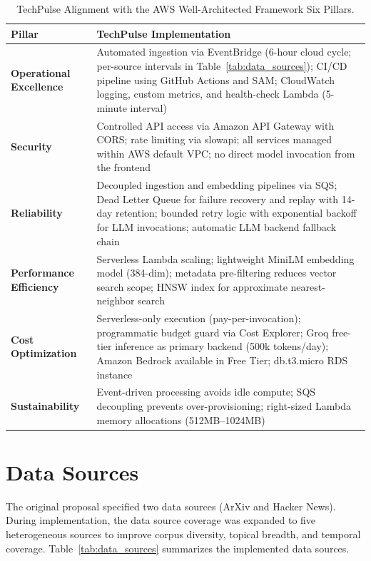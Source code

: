 \begin{table}[H]
\caption{TechPulse Alignment with the AWS Well-Architected Framework Six Pillars.}
\label{tab:well_arch}
\centering
\begin{tabular}{p{3.2cm}p{9.3cm}}
\toprule
\textbf{Pillar} & \textbf{TechPulse Implementation} \\
\midrule
\textbf{Operational Excellence} & Automated ingestion via EventBridge (6-hour cloud cycle; per-source intervals in Table~\ref{tab:data_sources}); CI/CD pipeline using GitHub Actions and SAM; CloudWatch logging, custom metrics, and health-check Lambda (5-minute interval) \\[4pt]
\textbf{Security} & Controlled API access via Amazon API Gateway with CORS; rate limiting via slowapi; all services managed within AWS default VPC; no direct model invocation from the frontend \\[4pt]
\textbf{Reliability} & Decoupled ingestion and embedding pipelines via SQS; Dead Letter Queue for failure recovery and replay with 14-day retention; bounded retry logic with exponential backoff for LLM invocations; automatic LLM backend fallback chain \\[4pt]
\textbf{Performance Efficiency} & Serverless Lambda scaling; lightweight MiniLM embedding model (384-dim); metadata pre-filtering reduces vector search scope; HNSW index for approximate nearest-neighbor search \\[4pt]
\textbf{Cost Optimization} & Serverless-only execution (pay-per-invocation); programmatic budget guard via Cost Explorer; Groq free-tier inference as primary backend (500k tokens/day); Amazon Bedrock available in Free Tier; db.t3.micro RDS instance \\[4pt]
\textbf{Sustainability} & Event-driven processing avoids idle compute; SQS decoupling prevents over-provisioning; right-sized Lambda memory allocations (512MB--1024MB) \\
\bottomrule
\end{tabular}
\end{table}

\section{Data Sources}
\label{sec:data_sources}

The original proposal specified two data sources (ArXiv and Hacker News). During implementation, the data source coverage was expanded to five heterogeneous sources to improve corpus diversity, topical breadth, and temporal coverage. Table~\ref{tab:data_sources} summarizes the implemented data sources.

